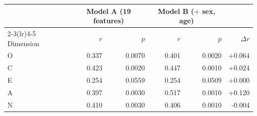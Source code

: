 \begin{tabular}{lrrrrr}
\toprule
 & \multicolumn{2}{c}{Model A (19 features)} & \multicolumn{2}{c}{Model B ($+$ sex, age)} & \\
\cmidrule(lr){2-3}\cmidrule(lr){4-5}
Dimension & $r$ & $p$ & $r$ & $p$ & $\Delta r$ \\
\midrule
O & 0.337 & 0.0070 & 0.401 & 0.0020 & +0.064 \\
C & 0.423 & 0.0020 & 0.447 & 0.0010 & +0.024 \\
E & 0.254 & 0.0559 & 0.254 & 0.0509 & +0.000 \\
A & 0.397 & 0.0030 & 0.517 & 0.0010 & +0.120 \\
N & 0.410 & 0.0030 & 0.406 & 0.0010 & -0.004 \\
\bottomrule
\end{tabular}
